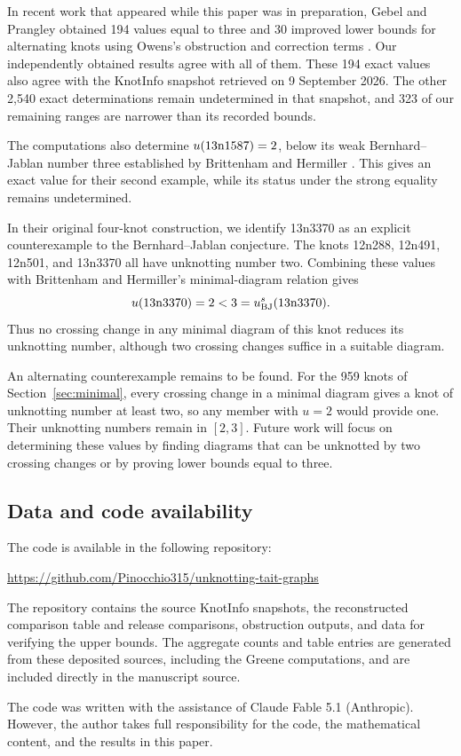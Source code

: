 \documentclass[12pt, oneside]{amsart}
\newcommand{\KI}{\textsf{KnotInfo}}
\newcommand{\kn}[2]{\textup{#1#2}}
\newcommand{\nDichotomy}{959}
\newcommand{\nGPExact}{194}
\newcommand{\nGPImproved}{30}
\newcommand{\nLatestRangeImprovements}{323}
\newcommand{\nLatestUnresolvedExact}{2{,}540}
\begin{document}
In recent work that appeared while this paper was in preparation, Gebel and
Prangley obtained \nGPExact{} values equal to three and \nGPImproved{} improved
lower bounds for alternating knots using Owens's obstruction and correction
terms \cite{GP}. Our independently obtained results agree with all of them.
These \nGPExact{} exact values also agree with the \KI{} snapshot retrieved
on 9 September 2026. The other \nLatestUnresolvedExact{} exact determinations
remain undetermined in that snapshot, and \nLatestRangeImprovements{} of our
remaining ranges are narrower than its recorded bounds.

The computations also determine $u(\kn{13n}{1587})=2$, below its weak
Bernhard--Jablan number three established by Brittenham and Hermiller
\cite[\S3]{BH1705}. This gives an exact value for their second example,
while its status under the strong equality remains undetermined.

In their original four-knot construction, we identify \kn{13n}{3370} as
an explicit counterexample to the Bernhard--Jablan conjecture. The knots
\kn{12n}{288}, \kn{12n}{491}, \kn{12n}{501}, and \kn{13n}{3370} all have
unknotting number two. Combining these values with Brittenham and Hermiller's
minimal-diagram relation \cite[Thm.~1.3(c)]{BH1705} gives
\[
    u(\kn{13n}{3370})=2<3=u^s_{\mathrm{BJ}}(\kn{13n}{3370}).
\]
Thus no crossing change in any minimal diagram of this knot reduces its
unknotting number, although two crossing changes suffice in a suitable diagram.

An alternating counterexample remains to be found. For the \nDichotomy{}
knots of Section~\ref{sec:minimal}, every crossing change in a minimal
diagram gives a knot of unknotting number at least two, so any member with
$u=2$ would provide one. Their unknotting numbers remain in $[2,3]$.
Future work will focus on determining these values by finding diagrams
that can be unknotted by two crossing changes or by proving lower bounds
equal to three.

\begin{samepage}
\subsection*{Data and code availability}
The code is available in the following repository:
\begin{center}
    \url{https://github.com/Pinocchio315/unknotting-tait-graphs}
\end{center}
The repository contains the source \KI{} snapshots, the reconstructed
comparison table and release comparisons, obstruction outputs, and data for
verifying the upper bounds. The aggregate counts and table entries are
generated from these deposited sources, including the Greene computations,
and are included directly in the manuscript source. 

The code was written with the assistance of Claude Fable 5.1 (Anthropic).
However, the author takes full responsibility for the code,
the mathematical content, and the results in this paper.
\end{samepage}
\end{document}
